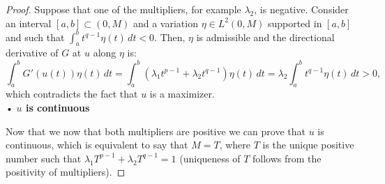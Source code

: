 \documentclass[corpo=11pt, stile=classica, tipotesi=custom,
greek, evenboxes, english]{toptesi}
\numberwithin{equation}{chapter}
\theoremstyle{definition}
\theoremstyle{remark}
\begin{document}
\begin{proof}
Suppose that one of the multipliers, for example $\lambda_2$, is negative. Consider an interval $[a,b] \subset (0,M)$ and a variation $\eta \in L^2(0,M)$ supported in $[a,b]$ and such that $\int_{a}^{b}t^{q-1}\eta(t)\,dt <0$. Then, $\eta$ is admissible and the directional derivative of $G$ at $u$ along $\eta$ is:
\begin{equation*}
	\int_{a}^{b} G'(u(t))\eta(t)\,dt = \int_{a}^{b} (\lambda_1 t^{p-1} + \lambda_2 t^{q-1})\eta(t)\,dt = \lambda_2 \int_{a}^{b} t^{q-1} \eta(t)\,dt > 0,
\end{equation*}
which contradicts the fact that $u$ is a maximizer.\\
• \textbf{$u$ is continuous}

Now that we now that both multipliers are positive we can prove that $u$ is continuous, which is equivalent to say that $M=T$, where $T$ is the unique positive number such that $\lambda_1 T^{p-1} + \lambda_2 T^{q-1} = 1$ (uniqueness of $T$ follows from the positivity of multipliers).


\end{proof}
\end{document}
